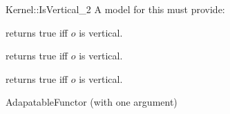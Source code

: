 \begin{ccRefFunctionObjectConcept}{Kernel::IsVertical_2}
A model for this must provide:


{returns true iff $o$ is vertical.}

{returns true iff $o$ is vertical.}

{returns true iff $o$ is vertical.}

\ccRefines
AdapatableFunctor (with one argument)

\ccSeeAlso
{} \\
 \\
 \\

\end{ccRefFunctionObjectConcept}
